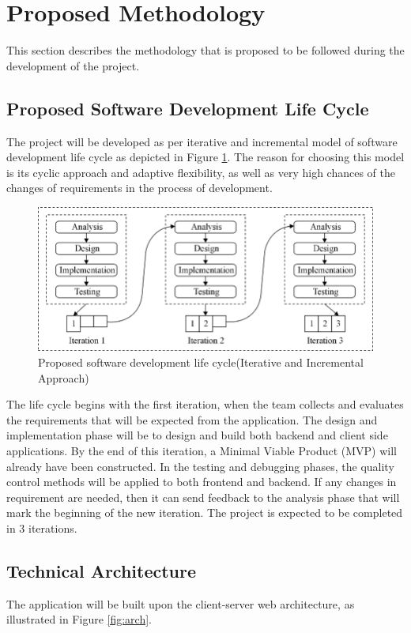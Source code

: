 \documentclass[12pt, a4paper, oneside]{article}
\begin{document}
\break
\section{Proposed Methodology}
This section describes the methodology that is proposed to be followed during the development of the project.

\subsection{Proposed Software Development Life Cycle}
The project will be developed as per iterative and incremental model of software development life cycle as depicted in Figure \ref{fig:sdlc}. The reason for choosing this model is its cyclic approach and adaptive flexibility, as well as very high chances of the changes of requirements in the process of development. 

\begin{figure}[h]
	\includegraphics[width=\linewidth]{sdlc}
	\centering
	\caption{Proposed software development life cycle(Iterative and Incremental Approach)}
	\label{fig:sdlc}
\end{figure}

The life cycle begins with the first iteration, when the team collects and evaluates the requirements that will be expected from the application. The design and\\ implementation phase will be to design and build both backend and client side applications. By the end of this iteration, a Minimal Viable Product (MVP) will already have been constructed. In the testing and debugging phases, the quality control methods will be applied to both frontend and backend. If any changes in requirement are needed, then it can send feedback to the analysis phase that will mark the beginning of the new iteration. The project is expected to be completed in 3 iterations.
 

\subsection{Technical Architecture}
The application will be built upon the client-server web architecture, as illustrated in Figure \ref{fig:arch}.
\end{document}
